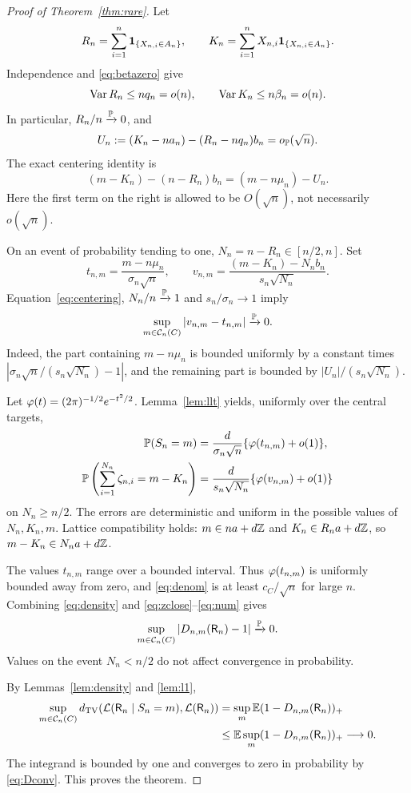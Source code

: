 \begin{proof}[Proof of Theorem~\ref{thm:rare}]
Let
\begin{equation}\label{eq:RK}
 R_n=\sum_{i=1}^n\mathbf 1_{\{X_{n,i}\in A_n\}},\qquad
 K_n=\sum_{i=1}^nX_{n,i}\mathbf 1_{\{X_{n,i}\in A_n\}}.
\end{equation}
Independence and \eqref{eq:betazero} give
\begin{equation}\label{eq:fluct}
 \operatorname{Var} R_n\le nq_n=o(n),\qquad \operatorname{Var} K_n\le n\beta_n=o(n).
\end{equation}
In particular, $R_n/n\xrightarrow{\mathbb P}0$, and
\[
 U_n:=(K_n-na_n)-(R_n-nq_n)b_n=o_{\mathbb P}(\sqrt n).
\]
The exact centering identity is
\begin{equation}\label{eq:centering}
 (m-K_n)-(n-R_n)b_n=(m-n\mu_n)-U_n.
\end{equation}
Here the first term on the right is allowed to be $O(\sqrt n)$, not necessarily $o(\sqrt n)$.

On an event of probability tending to one, $N_n=n-R_n\in[n/2,n]$. Set
\[
 t_{n,m}=\frac{m-n\mu_n}{\sigma_n\sqrt n},\qquad
 v_{n,m}=\frac{(m-K_n)-N_nb_n}{s_n\sqrt{N_n}}.
\]
Equation~\eqref{eq:centering}, $N_n/n\xrightarrow{\mathbb P}1$ and $s_n/\sigma_n\to1$ imply
\begin{equation}\label{eq:zclose}
 \sup_{m\in\mathcal C_n(C)}|v_{n,m}-t_{n,m}|\xrightarrow{\mathbb P}0.
\end{equation}
Indeed, the part containing $m-n\mu_n$ is bounded uniformly by a constant times
$|\sigma_n\sqrt n/(s_n\sqrt{N_n})-1|$, and the remaining part is bounded by $|U_n|/(s_n\sqrt{N_n})$.

Let $\varphi(t)=(2\pi)^{-1/2}e^{-t^2/2}$. Lemma~\ref{lem:llt} yields, uniformly over the central targets,
\begin{align}
 \mathbb P(S_n=m)&=\frac{d}{\sigma_n\sqrt n}\{\varphi(t_{n,m})+o(1)\},\label{eq:denom}\\
 \mathbb P\left(\sum_{i=1}^{N_n}\zeta_{n,i}=m-K_n\right)
 &=\frac{d}{s_n\sqrt{N_n}}\{\varphi(v_{n,m})+o(1)\}\label{eq:num}
\end{align}
on $N_n\ge n/2$. The errors are deterministic and uniform in the possible values of $N_n,K_n,m$. Lattice compatibility holds: $m\in na+d\mathbb Z$ and $K_n\in R_na+d\mathbb Z$, so $m-K_n\in N_na+d\mathbb Z$.

The values $t_{n,m}$ range over a bounded interval. Thus $\varphi(t_{n,m})$ is uniformly bounded away from zero, and \eqref{eq:denom} is at least $c_C/\sqrt n$ for large $n$. Combining \eqref{eq:density} and \eqref{eq:zclose}--\eqref{eq:num} gives
\begin{equation}\label{eq:Dconv}
 \sup_{m\in\mathcal C_n(C)}|D_{n,m}(\mathsf R_n)-1|\xrightarrow{\mathbb P}0.
\end{equation}
Values on the event $N_n<n/2$ do not affect convergence in probability.

By Lemmas~\ref{lem:density} and \ref{lem:l1},
\begin{align*}
 \sup_{m\in\mathcal C_n(C)}d_{\mathrm{TV}}(\mathcal L(\mathsf R_n\mid S_n=m),\mathcal L(\mathsf R_n))
 &=\sup_m\mathbb E(1-D_{n,m}(\mathsf R_n))_+\\
 &\le\mathbb E\sup_m(1-D_{n,m}(\mathsf R_n))_+\longrightarrow0.
\end{align*}
The integrand is bounded by one and converges to zero in probability by \eqref{eq:Dconv}. This proves the theorem.
\end{proof}

